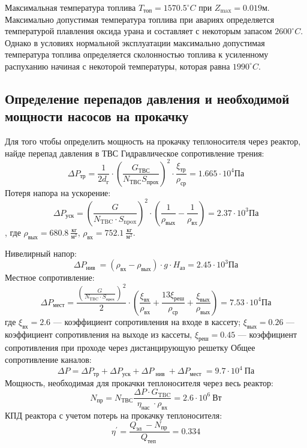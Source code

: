 Максимальная температура топлива $T_{\text{топ}} = 1570.5 ^\circ C$ при $Z_{\text{max}} = 0.019 \text{м}$. Максимально допустимая температура топлива при авариях определяется температурой плавления оксида урана и составляет с некоторым запасом $2600 ^\circ C$. Однако в условиях нормальной эксплуатации максимально допустимая температура топлива определяется сколонностью топлива к усиленному распуханию начиная с некоторой температуры, которая равна $1990 ^\circ C$.

\subsection{Определение перепадов давления и необходимой мощности насосов на прокачку}
Для того чтобы определить мощность на прокачку теплоносителя через реактор, найде перепад давления в ТВС
Гидравлическое сопротивление трения:
$$
\Delta P_{\text{тр}} = \frac 1 {2 d_{\text{г}}} \cdot \left(\frac {G_{\text{ТВС}}}{N_{\text{ТВС}}S_{\text{прох}}}  \right)^2 \cdot \frac {\xi_{\text{тр}}} {\rho_{\text{ср}}} = 1.665 \cdot 10^4 \text{Па}
$$
Потеря напора на ускорение:
$$
\Delta P_{\mathrm{уск}} = \left( \frac{G}{N_{\mathrm{TBC}} \cdot S_{\mathrm{npox}}} \right)^{2} \cdot \left(\frac{1}{\rho_{\mathrm{вых}}} - \frac{1}{\rho_{\mathrm{вx}}} \right) = 2.37 \cdot 10^3 \text{Па}
$$, где $\rho_{\text{вых}} = 680.8\ \frac{\text{кг}}{\text{м}^2} $, $\rho_{\text{вх}} =752.1\  \frac {\text{кг}}{\text{м}^2}$.

\noindent Нивелирный напор:
$$
\Delta P_{\text {нив }} = \left( \rho_{\text{вх}} - \rho_{\text{вых}} \right) \cdot g \cdot H_{\text{аз}}= 2.45 \cdot 10^{3} \text{Па}
$$
Местное сопротивление:
$$
\Delta P_{\mathrm{мест}} = \frac{ \left( \frac{G}{N_{\mathrm{TBC}} \cdot S_{\mathrm{прох}}} \right)^{2} }{2} \cdot \left( \frac{\xi_{\mathrm{вх}}}{\rho_{\mathrm{вх}}}+\frac{13 \xi_{\mathrm{реш}}}{\rho_{\mathrm{ср}}}+\frac{ \xi_{\mathrm{вых}}}{\rho_{\mathrm{вых}}} \right) = 7.53 \cdot 10^4 \text{Па}
$$
где $\xi_{\text{вх}}= 2.6 $ — коэффициент сопротивления на входе в кассету; $\xi_{\text{вых}} = 0.26$ — коэффициент сопротивления на выходе из кассеты, $\xi_{\text{реш}} = 0.45$ — коэффициент сопротивления при проходе через дистанцирующую решетку %
Общее сопротивление каналов:
$$
\Delta P=\Delta P_{\mathrm{тр}}+\Delta P_{\mathrm{уск}}+\Delta P_{\text { нив }}+\Delta P_{\text {мест }} = 9.7 \cdot 10^4\  \text{Па} 
$$
Мощность, необходимая для прокачки теплоносителя через весь реактор:
$$
N_{\mathrm{пр}}=N_{\mathrm{ТВС}} \frac{\Delta P \cdot G_{\mathrm{TBC}}}{\eta_{\text {нас }} \cdot \rho_{\mathrm{вх}}}= 2.6 \cdot 10^6\  \text{Вт}
$$
КПД реактора с учетом потерь на прокачку теплоносителя:
$$
\eta^{\prime}=\frac{Q_{\text {эл }}-N_{\text {пр }}}{Q_{\text {теп }}} = 0.334 
$$

